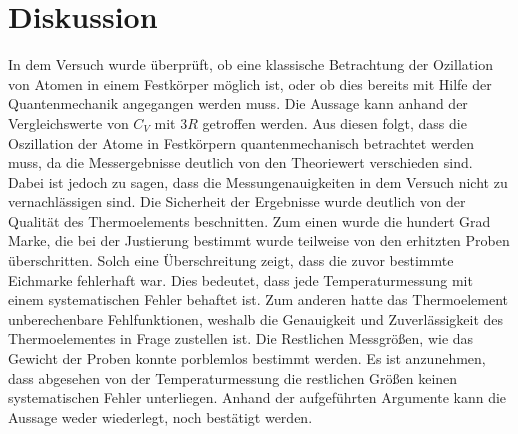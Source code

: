 \section{Diskussion}

In dem Versuch wurde überprüft, ob eine klassische Betrachtung der Ozillation
von Atomen in einem Festkörper möglich ist, oder ob dies bereits mit Hilfe
der Quantenmechanik angegangen werden muss. Die Aussage kann anhand der
Vergleichswerte von $C_V$ mit $3R$ getroffen werden. Aus diesen folgt, dass
die Oszillation der Atome in Festkörpern quantenmechanisch betrachtet werden
muss, da die Messergebnisse deutlich von den Theoriewert verschieden sind.
Dabei ist jedoch zu sagen, dass die Messungenauigkeiten in dem Versuch nicht
zu vernachlässigen sind. Die Sicherheit der Ergebnisse  wurde deutlich von der
Qualität des Thermoelements beschnitten. Zum einen wurde die hundert Grad Marke,
die bei der Justierung bestimmt wurde teilweise von den erhitzten Proben
überschritten. Solch eine Überschreitung zeigt, dass die zuvor bestimmte
Eichmarke fehlerhaft war. Dies bedeutet, dass jede Temperaturmessung mit einem
systematischen Fehler behaftet ist. Zum anderen hatte das Thermoelement
unberechenbare Fehlfunktionen, weshalb die Genauigkeit und Zuverlässigkeit des
Thermoelementes in Frage zustellen ist. Die Restlichen Messgrößen, wie das
Gewicht der Proben konnte porblemlos bestimmt werden. Es ist anzunehmen, dass
abgesehen von der Temperaturmessung die restlichen Größen keinen systematischen
Fehler unterliegen. Anhand der aufgeführten Argumente kann die Aussage
weder wiederlegt, noch bestätigt werden.

\printbibliography


